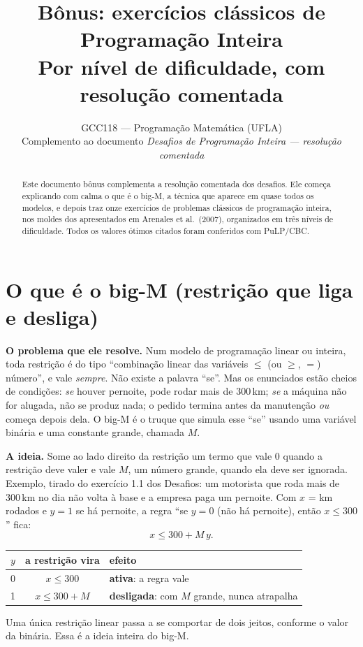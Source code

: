 \documentclass[11pt,a4paper]{article}
\title{\textbf{Bônus: exercícios clássicos de Programação Inteira}\\[4pt]\large Por nível de dificuldade, com resolução comentada}
\author{GCC118 --- Programação Matemática (UFLA)\\[2pt]\small Complemento ao documento \emph{Desafios de Programação Inteira --- resolução comentada}}
\date{}
\begin{document}
\maketitle
\thispagestyle{empty}

\begin{abstract}
\noindent Este documento bônus complementa a resolução comentada dos desafios. Ele começa explicando com calma o que é o
big-M, a técnica que aparece em quase todos os modelos, e depois traz onze exercícios de problemas clássicos de
programação inteira, nos moldes dos apresentados em Arenales et al.\ (2007), organizados em três níveis de dificuldade.
Todos os valores ótimos citados foram conferidos com PuLP/CBC.
\end{abstract}

\tableofcontents

\clearpage
\section*{O que é o big-M (restrição que liga e desliga)}

\textbf{O problema que ele resolve.} Num modelo de programação linear ou inteira, toda restrição é do tipo
``combinação linear das variáveis $\le$ (ou $\ge$, $=$) número'', e vale \emph{sempre}. Não existe a palavra ``se''. Mas os
enunciados estão cheios de condições: \emph{se} houver pernoite, pode rodar mais de 300\,km; \emph{se} a máquina não for
alugada, não se produz nada; o pedido termina antes da manutenção \emph{ou} começa depois dela. O big-M é o truque que
simula esse ``se'' usando uma variável binária e uma constante grande, chamada $M$.

\textbf{A ideia.} Some ao lado direito da restrição um termo que vale 0 quando a restrição deve valer e vale $M$, um
número grande, quando ela deve ser ignorada. Exemplo, tirado do exercício 1.1 dos Desafios: um motorista que roda mais de
300\,km no dia não volta à base e a empresa paga um pernoite. Com $x$ = km rodados e $y=1$ se há pernoite, a regra
``se $y=0$ (não há pernoite), então $x\le300$'' fica:
\[
  x \le 300 + M\,y .
\]
\begin{center}
\begin{tabular}{ccl}
\toprule
$y$ & a restrição vira & efeito\\
\midrule
0 & $x \le 300$ & \textbf{ativa}: a regra vale\\
1 & $x \le 300 + M$ & \textbf{desligada}: com $M$ grande, nunca atrapalha\\
\bottomrule
\end{tabular}
\end{center}
Uma única restrição linear passa a se comportar de dois jeitos, conforme o valor da binária. Essa é a ideia inteira do big-M.
\end{document}
